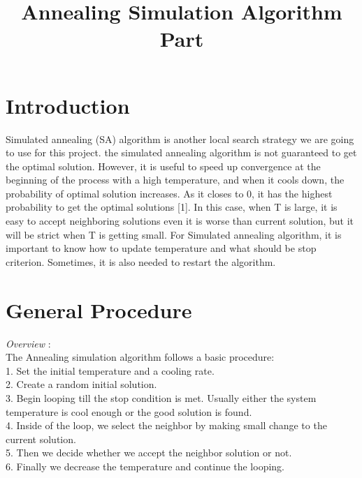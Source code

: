 \documentclass[12pt]{article}
\begin{document}
\title{Annealing Simulation Algorithm Part}
\maketitle
\section{Introduction}
Simulated annealing (SA) algorithm is another local search strategy we are going to use for this project.   the simulated annealing algorithm is not guaranteed to get the optimal solution. However, it is useful to speed up convergence at the beginning of the process with a high temperature, and when it cools down, the probability of optimal solution increases. As it closes to 0, it has the highest probability to get the optimal solutions [1]. In this case, when T is large, it is easy to accept neighboring solutions even it is worse than current solution, but it will be strict when T is getting small. For Simulated annealing algorithm, it is important to know how to update temperature and what should be stop criterion. Sometimes, it is also needed to restart the algorithm.\\

\section{General Procedure}

\textit{Overview} : \\
The Annealing simulation algorithm follows a basic procedure:\\
1. Set the initial temperature and a cooling rate. \\
2. Create a random initial solution. \\
3. Begin looping till the stop condition is met. Usually either the system temperature is cool enough or the good solution is found. \\
4. Inside of the loop, we select the neighbor by making small change to the current solution. \\
5. Then we decide whether we accept the neighbor solution or not. \\
6. Finally we decrease the temperature and continue the looping. \\
\\
\end{document}
